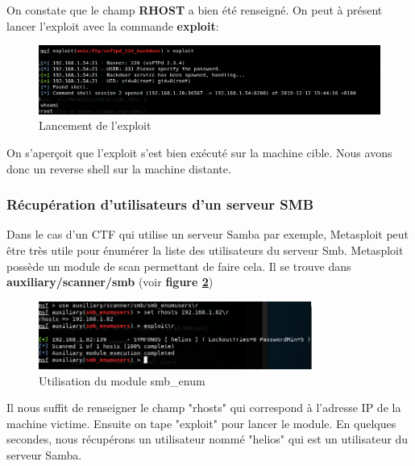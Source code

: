 On constate que le champ \textbf{RHOST} a bien été renseigné. On peut à présent lancer l'exploit avec la commande \textbf{exploit}:

\begin{figure}[htp!]
  \centering
  \setlength\figureheight{7cm}
  \setlength\figurewidth{9cm}
  \includegraphics[width=1\textwidth]{oui/Ancien/imangeancien/metasploit/ftp4.PNG}
  \caption{Lancement de l'exploit}
  \label{fig:courbe-tikz}
\end{figure}

On s'aperçoit que l'exploit s'est bien exécuté sur la machine cible. Nous avons donc un reverse shell sur la machine distante.

\subsubsection{Récupération d'utilisateurs d'un serveur SMB}
Dans le cas d'un CTF qui utilise un serveur Samba par exemple, Metasploit peut être très utile pour énumérer la liste des utilisateurs du serveur Smb. Metasploit possède un module de scan permettant de faire cela. Il se trouve dans \textbf{auxiliary/scanner/smb} (voir \textbf{figure \ref{fig:smb-enum}})\\

\begin{figure}[h]
  \centering
  \setlength\figureheight{7cm}
  \setlength\figurewidth{9cm}
  \includegraphics[width=0.8\textwidth]{oui/Ancien/imangeancien/msf_smb_enum.PNG}
  \caption{Utilisation du module smb\_enum}
  \label{fig:smb-enum}
\end{figure}

Il nous suffit de renseigner le champ "rhosts" qui correspond à l'adresse IP de la machine victime. Ensuite on tape "exploit" pour lancer le module. En quelques secondes, nous récupérons un utilisateur nommé "helios" qui est un utilisateur du serveur Samba.\\

